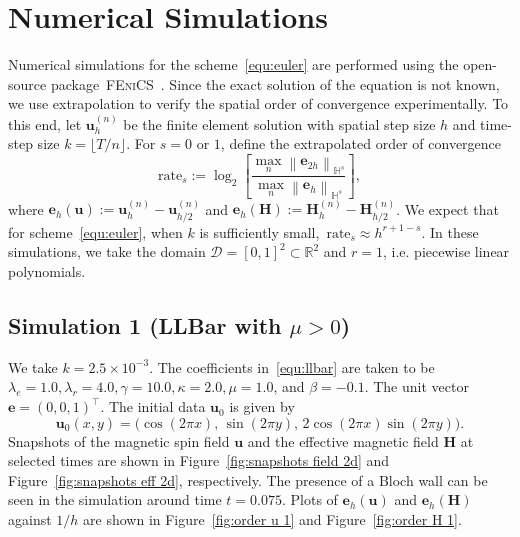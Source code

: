 \documentclass[11pt, reqno]{amsart}
\theoremstyle{definition}
\theoremstyle{remark}
\numberwithin{equation}{section}
\newcommand{\bff}{\boldsymbol}
\newcommand{\bb}{\mathbb}
\newcommand{\norm}[2]{\left\|{#1}\right\|_{#2}}
\begin{document}
\section{Numerical Simulations}\label{sec:simulation}

Numerical simulations for the scheme~\eqref{equ:euler} are performed using the open-source package~\textsc{FEniCS}~\cite{AlnaesEtal15}. Since the exact solution of the equation is not known, we use extrapolation to verify the spatial order of convergence experimentally. To this end, let $\bff{u}_h^{(n)}$ be the finite element solution with spatial step size $h$ and time-step size $k=\lfloor T/n\rfloor$. For $s=0$ or $1$, define the extrapolated order of convergence
\begin{equation*}
	\text{rate}_s :=  \log_2 \left[\frac{\max_n \norm{\bff{e}_{2h}}{\bb{H}^s}}{\max_n \norm{\bff{e}_{h}}{\bb{H}^s}}\right],
\end{equation*}
where $\bff{e}_h(\bff{u}) := \bff{u}_{h}^{(n)}-\bff{u}_{h/2}^{(n)}$ and $\bff{e}_h(\bff{H}) := \bff{H}_{h}^{(n)}-\bff{H}_{h/2}^{(n)}$. We expect that for scheme~\eqref{equ:euler}, when $k$ is sufficiently small,~$\text{rate}_s \approx h^{r+1-s}$. In these simulations, we take the domain $\mathscr{D}= [0,1]^2\subset \bb{R}^2$ and $r=1$, i.e. piecewise linear polynomials.

\subsection{Simulation 1 (LLBar with $\mu>0$)}
We take $k=2.5\times 10^{-3}$. The coefficients in~\eqref{equ:llbar} are taken to be $\lambda_e=1.0, \lambda_r=4.0, \gamma=10.0, \kappa=2.0, \mu=1.0$, and $\beta=-0.1$. The unit vector $\bff{e}=(0,0,1)^\top$. The initial data $\bff{u}_0$ is given by
\begin{equation*}
	\bff{u}_0(x,y)= \big(\cos(2\pi x),\, \sin(2\pi y),\, 2\cos(2\pi x) \sin(2\pi y) \big).
\end{equation*}
Snapshots of the magnetic spin field $\bff{u}$ and the effective magnetic field $\bff{H}$ at selected times are shown in Figure~\ref{fig:snapshots field 2d} and Figure~\ref{fig:snapshots eff 2d}, respectively. The presence of a Bloch wall can be seen in the simulation around time $t=0.075$. Plots of $\bff{e}_h(\bff{u})$ and $\bff{e}_h(\bff{H})$ against $1/h$ are shown in Figure~\ref{fig:order u 1} and Figure~\ref{fig:order H 1}.
\end{document}
